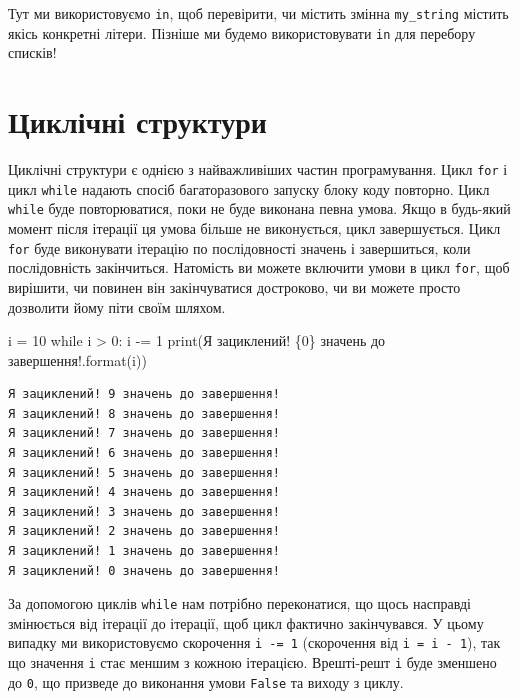 \documentclass[
  letterpaper,
]{report}
\newenvironment{Shaded}{\begin{snugshade}}{\end{snugshade}}
\newcommand{\BuiltInTok}[1]{\textcolor[rgb]{0.00,0.23,0.31}{#1}}
\newcommand{\ControlFlowTok}[1]{\textcolor[rgb]{0.00,0.23,0.31}{#1}}
\newcommand{\DecValTok}[1]{\textcolor[rgb]{0.68,0.00,0.00}{#1}}
\newcommand{\NormalTok}[1]{\textcolor[rgb]{0.00,0.23,0.31}{#1}}
\newcommand{\OperatorTok}[1]{\textcolor[rgb]{0.37,0.37,0.37}{#1}}
\newcommand{\SpecialCharTok}[1]{\textcolor[rgb]{0.37,0.37,0.37}{#1}}
\newcommand{\StringTok}[1]{\textcolor[rgb]{0.13,0.47,0.30}{#1}}
\begin{document}
Тут ми використовуємо \texttt{in}, щоб перевірити, чи містить змінна
\texttt{my\_string} містить якісь конкретні літери. Пізніше ми будемо
використовувати \texttt{in} для перебору списків!

\hypertarget{ux446ux438ux43aux43bux456ux447ux43dux456-ux441ux442ux440ux443ux43aux442ux443ux440ux438}{%
\section{Циклічні
структури}\label{ux446ux438ux43aux43bux456ux447ux43dux456-ux441ux442ux440ux443ux43aux442ux443ux440ux438}}

Циклічні структури є однією з найважливіших частин програмування. Цикл
\texttt{for} і цикл \texttt{while} надають спосіб багаторазового запуску
блоку коду повторно. Цикл \texttt{while} буде повторюватися, поки не
буде виконана певна умова. Якщо в будь-який момент після ітерації ця
умова більше не виконується, цикл завершується. Цикл \texttt{for} буде
виконувати ітерацію по послідовності значень і завершиться, коли
послідовність закінчиться. Натомість ви можете включити умови в цикл
\texttt{for}, щоб вирішити, чи повинен він закінчуватися достроково, чи
ви можете просто дозволити йому піти своїм шляхом.

\begin{Shaded}
\begin{Highlighting}[]
\NormalTok{i }\OperatorTok{=} \DecValTok{10}
\ControlFlowTok{while}\NormalTok{ i }\OperatorTok{\textgreater{}} \DecValTok{0}\NormalTok{:}
\NormalTok{    i }\OperatorTok{{-}=} \DecValTok{1}
    \BuiltInTok{print}\NormalTok{(}\StringTok{\textquotesingle{}Я зациклений! }\SpecialCharTok{\{0\}}\StringTok{ значень до завершення!\textquotesingle{}}\NormalTok{.}\BuiltInTok{format}\NormalTok{(i))}
\end{Highlighting}
\end{Shaded}

\begin{verbatim}
Я зациклений! 9 значень до завершення!
Я зациклений! 8 значень до завершення!
Я зациклений! 7 значень до завершення!
Я зациклений! 6 значень до завершення!
Я зациклений! 5 значень до завершення!
Я зациклений! 4 значень до завершення!
Я зациклений! 3 значень до завершення!
Я зациклений! 2 значень до завершення!
Я зациклений! 1 значень до завершення!
Я зациклений! 0 значень до завершення!
\end{verbatim}

За допомогою циклів \texttt{while} нам потрібно переконатися, що щось
насправді змінюється від ітерації до ітерації, щоб цикл фактично
закінчувався. У цьому випадку ми використовуємо скорочення
\texttt{i\ -=\ 1} (скорочення від \texttt{i\ =\ i\ -\ 1}), так що
значення \texttt{i} стає меншим з кожною ітерацією. Врешті-решт
\texttt{i} буде зменшено до \texttt{0}, що призведе до виконання умови
\texttt{False} та виходу з циклу.
\end{document}

